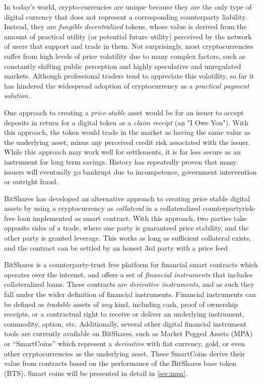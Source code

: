 In today's world, crypto-currencies are unique because they are the only type
of digital currency that does not represent a corresponding counterparty
liability. Instead, they are \emph{fungible} \emph{decentralized} tokens, whose
value is derived from the amount of practical utility (or potential future
utility) perceived by the network of users that support and trade in them. Not
surprisingly, most cryptocurrencies suffer from high levels of price volatility
due to many complex factors, such as constantly shifting public perception and
highly speculative and unregulated markets. Although professional traders tend
to appreciate this volatility, so far it has hindered the widespread adoption
of cryptocurrency as a \emph{practical payment solution}.

One approach to creating a \emph{price-stable} asset would be for an issuer to
accept deposits in return for a digital token as a \emph{claim receipt} (an "I
Owe You"). With this approach, the token would trade in the market as having
the same value as the underlying asset, minus any perceived credit risk
associated with the issuer. While this approach may work well for settlements,
it is far less secure as an instrument for long term savings. History has
repeatedly proven that many issuers will eventually go bankrupt due to
incompetence, government intervention or outright fraud.

BitShares has developed an alternative approach to creating price stable
digital assets by using a cryptocurrency as \emph{collateral} in a
collateralized counterpartyrisk-free loan implemented as smart contract.
With this approach, two parties take opposite sides of a trade, where
one party is guaranteed price stability, and the other party is granted
leverage. This works as long as sufficient collateral exists, and the
contract can be settled by an honest 3rd party with a price feed

BitShares is a counterparty-trust free platform for financial smart contracts
which operates over the internet, and offers a set of \emph{financial
instruments} that includes collateralized loans. These contracts are \emph{derivative
instruments}, and as such they fall under the wider definition of financial
instruments. Financial instruments can be defined as \emph{tradable} assets of
\emph{any} kind, including cash, proof of ownership receipts, or a contractual
right to receive or deliver an underlying instrument, commodity, option, etc.
Additionally, several other digital financial instrument tools are currently
available on BitShares, such as Market Pegged Assets (MPA) or ``SmartCoins''
which represent a \emph{derivative} with fiat currency, gold, or even other
cryptocurrencies as the underlying asset. These SmartCoins derive their value
from contracts based on the performance of the BitShares base token (BTS).
Smart coins will be presented in detail in \cref{sec:mpa}. 

